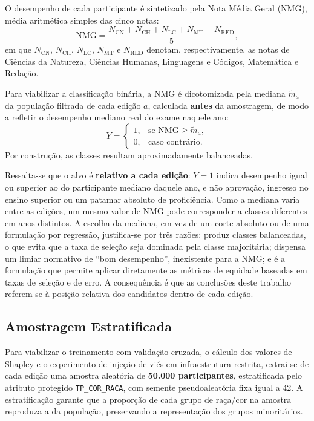 O desempenho de cada participante é sintetizado pela Nota Média Geral (NMG), média aritmética simples das cinco notas:
\begin{equation}
\mathrm{NMG} = \frac{N_{\mathrm{CN}} + N_{\mathrm{CH}} + N_{\mathrm{LC}} + N_{\mathrm{MT}} + N_{\mathrm{RED}}}{5},
\label{eq:nmg}
\end{equation}
em que $N_{\mathrm{CN}}$, $N_{\mathrm{CH}}$, $N_{\mathrm{LC}}$, $N_{\mathrm{MT}}$ e $N_{\mathrm{RED}}$ denotam, respectivamente, as notas de Ciências da Natureza, Ciências Humanas, Linguagens e Códigos, Matemática e Redação.

Para viabilizar a classificação binária, a NMG é dicotomizada pela mediana $\tilde{m}_a$ da população filtrada de cada edição $a$, calculada \textbf{antes} da amostragem, de modo a refletir o desempenho mediano real do exame naquele ano:
\begin{equation}
Y = \begin{cases} 1, & \text{se } \mathrm{NMG} \geq \tilde{m}_a,\\ 0, & \text{caso contrário.} \end{cases}
\label{eq:alvo}
\end{equation}
Por construção, as classes resultam aproximadamente balanceadas.

Ressalta-se que o alvo é \textbf{relativo a cada edição}: $Y = 1$ indica desempenho igual ou superior ao do participante mediano daquele ano, e não aprovação, ingresso no ensino superior ou um patamar absoluto de proficiência. Como a mediana varia entre as edições, um mesmo valor de NMG pode corresponder a classes diferentes em anos distintos. A escolha da mediana, em vez de um corte absoluto ou de uma formulação por regressão, justifica-se por três razões: produz classes balanceadas, o que evita que a taxa de seleção seja dominada pela classe majoritária; dispensa um limiar normativo de ``bom desempenho'', inexistente para a NMG; e é a formulação que permite aplicar diretamente as métricas de equidade baseadas em taxas de seleção e de erro. A consequência é que as conclusões deste trabalho referem-se à posição relativa dos candidatos dentro de cada edição.

\subsection{Amostragem Estratificada}

Para viabilizar o treinamento com validação cruzada, o cálculo dos valores de Shapley e o experimento de injeção de viés em infraestrutura restrita, extrai-se de cada edição uma amostra aleatória de \textbf{50.000 participantes}, estratificada pelo atributo protegido \texttt{TP\_COR\_RACA}, com semente pseudoaleatória fixa igual a 42. A estratificação garante que a proporção de cada grupo de raça/cor na amostra reproduza a da população, preservando a representação dos grupos minoritários.

